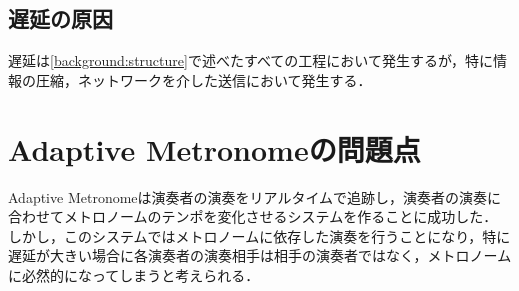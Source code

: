 \subsection{遅延の原因}
遅延は\ref{background:structure}で述べたすべての工程において発生するが，特に情報の圧縮，ネットワークを介した送信において発生する．

\section{Adaptive Metronomeの問題点}
\label{related:admet}
Adaptive Metronomeは演奏者の演奏をリアルタイムで追跡し，演奏者の演奏に合わせてメトロノームのテンポを変化させるシステムを作ることに成功した．
しかし，このシステムではメトロノームに依存した演奏を行うことになり，特に遅延が大きい場合に各演奏者の演奏相手は相手の演奏者ではなく，メトロノームに必然的になってしまうと考えられる．


